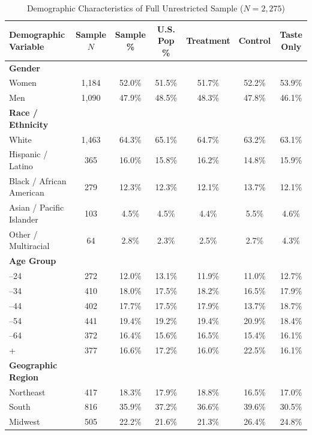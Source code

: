 \documentclass[12pt, letterpaper]{article}
\begin{document}
\begin{table}[ht!]
\centering
\small
\caption{Demographic Characteristics of Full Unrestricted Sample ($N = 2,275$)}
\label{tbl:full_sample_descriptives}
\setlength{\tabcolsep}{2.5pt}
\begin{tabular*}{\linewidth}{@{\extracolsep{\fill}}lcccccc@{}}
\toprule
Demographic Variable & Sample $N$ & Sample \% & U.S. Pop \% & Treatment & Control & Taste Only \\
\midrule
\textbf{Gender} & & & & & & \\
\quad Women & 1,184 & 52.0\% & 51.5\% & 51.7\% & 52.2\% & 53.9\% \\
\quad Men & 1,090 & 47.9\% & 48.5\% & 48.3\% & 47.8\% & 46.1\% \\
\addlinespace[3pt]
\textbf{Race / Ethnicity} & & & & & & \\
\quad White & 1,463 & 64.3\% & 65.1\% & 64.7\% & 63.2\% & 63.1\% \\
\quad Hispanic / Latino & 365 & 16.0\% & 15.8\% & 16.2\% & 14.8\% & 15.9\% \\
\quad Black / African American & 279 & 12.3\% & 12.3\% & 12.1\% & 13.7\% & 12.1\% \\
\quad Asian / Pacific Islander & 103 & 4.5\% & 4.5\% & 4.4\% & 5.5\% & 4.6\% \\
\quad Other / Multiracial & 64 & 2.8\% & 2.3\% & 2.5\% & 2.7\% & 4.3\% \\
\addlinespace[3pt]
\textbf{Age Group} & & & & & & \\
\quad 18--24 & 272 & 12.0\% & 13.1\% & 11.9\% & 11.0\% & 12.7\% \\
\quad 25--34 & 410 & 18.0\% & 17.5\% & 18.2\% & 16.5\% & 17.9\% \\
\quad 35--44 & 402 & 17.7\% & 17.5\% & 17.9\% & 13.7\% & 18.7\% \\
\quad 45--54 & 441 & 19.4\% & 19.2\% & 19.4\% & 20.9\% & 18.4\% \\
\quad 55--64 & 372 & 16.4\% & 15.6\% & 16.5\% & 15.4\% & 16.1\% \\
\quad 65+ & 377 & 16.6\% & 17.2\% & 16.0\% & 22.5\% & 16.1\% \\
\addlinespace[3pt]
\textbf{Geographic Region} & & & & & & \\
\quad Northeast & 417 & 18.3\% & 17.9\% & 18.8\% & 16.5\% & 17.0\% \\
\quad South & 816 & 35.9\% & 37.2\% & 36.6\% & 39.6\% & 30.5\% \\
\quad Midwest & 505 & 22.2\% & 21.6\% & 21.3\% & 26.4\% & 24.8\% \\

\end{tabular*}
\end{table}
\end{document}
